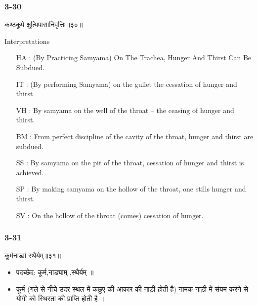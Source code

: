 \begin{frame}[fragile]\frametitle{3-30}
\begin{sanskrit}
कण्ठकूपे क्षुत्पिपासानिवृत्तिः॥३०॥
\end{sanskrit}

Interpretations
\begin{itemize}	
\item [HA]: (By Practicing Samyama) On The Trachea, Hunger And Thirst Can Be Subdued.
\item [IT]: (By performing Samyama) on the gullet the cessation of hunger and thirst
\item [VH]: By samyama on the well of the throat – the ceasing of hunger and thirst.
\item [BM]: From perfect discipline of the cavity of the throat, hunger and thirst are subdued.
\item [SS]: By samyama on the pit of the throat, cessation of hunger and thirst is achieved.
\item [SP]: By making samyama on the hollow of the throat, one stills hunger and thirst.
\item [SV]: On the hollow of the throat (comes) cessation of hunger. 
\end{itemize}
\end{frame}

\begin{frame}[fragile]\frametitle{3-31}
\begin{sanskrit}
कूर्मनाड्यां स्थैर्यम्॥३१॥
\end{sanskrit}

\begin{itemize}
\item पदच्छेद:  कूर्म,नाड्याम् ,स्थैर्यम् ॥
\item कूर्म (गले से नीचे उदर स्थल में कछुए की आकार की नाड़ी होती है) नामक नाड़ी में संयम करने से योगी को स्थिरता की प्राप्ति होती है ।
\end{itemize}
\end{frame}


